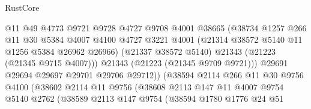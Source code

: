\begin{lexlean}{RustCore}
\begin{coremodule}
                                    @11
                                    @49
                                    @4773
                                    @9721
                                    @9728
                                    @4727
                                    @9708
                                    @4001
                                    @38665
                                    (@38734
                                      @1257
                                      @266
                                      @11
                                      @30
                                      @5384
                                      @4007
                                      @4100
                                      @4727
                                      @3221
                                      @4001
                                      (@21314 @38572 @5140 @11 @1256 @5384 @26962 @26966)
                                      (@21337 @38572 @5140)
                                      @21343
                                      (@21223 (@21345 @9715 @4007)))
                                    @21343
                                    (@21223 (@21345 @9709 @9721)))
                                  @29691
                                  @29694
                                  @29697
                                  @29701
                                  @29706
                                  @29712))
                              (@38594
                                @2114
                                @266
                                @11
                                @30
                                @9756
                                @4100
                                (@38602
                                  @2114
                                  @11
                                  @9756
                                  (@38608
                                    @2113
                                    @147
                                    @11
                                    @4007
                                    @9754
                                    @5140
                                    @2762
                                    (@38589
                                      @2113
                                      @147
                                      @9754
                                      (@38594
                                        @1780
                                        @1776
                                        @24
                                        @51

\end{coremodule}
\end{lexlean}
